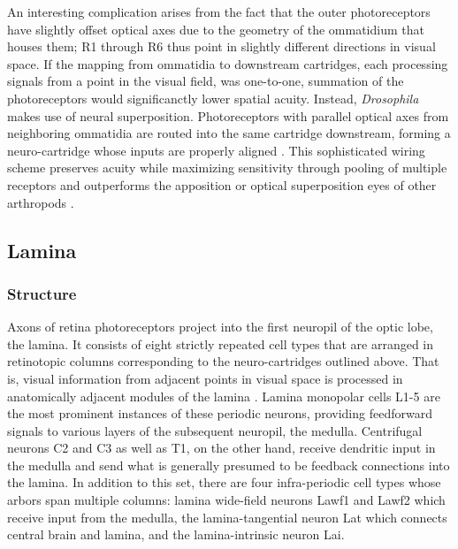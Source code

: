 An interesting complication arises from the fact that the outer photoreceptors have slightly offset optical axes due to the geometry of the ommatidium that houses them; R1 through R6 thus point in slightly different directions in visual space. If the mapping from ommatidia to downstream cartridges, each processing signals from a point in the visual field, was one-to-one, summation of the photoreceptors would significanctly lower spatial acuity. Instead, \textit{Drosophila} makes use of neural superposition. Photoreceptors with parallel optical axes from neighboring ommatidia are routed into the same cartridge downstream, forming a neuro-cartridge whose inputs are properly aligned \citep{Trujillo:1966aa,Braitenberg:1967aa}. This sophisticated wiring scheme preserves acuity while maximizing sensitivity through pooling of multiple receptors and outperforms the apposition or optical superposition eyes of other arthropods \citep{Kirschfeld:1967aa}.

\subsection{Lamina}

\subsubsection{Structure}
Axons of retina photoreceptors project into the first neuropil of the optic lobe, the lamina. It consists of eight strictly repeated cell types that are arranged in retinotopic columns corresponding to the neuro-cartridges outlined above. That is, visual information from adjacent points in visual space is processed in anatomically adjacent modules of the lamina \citep{Fischbach:1989uw}. Lamina monopolar cells L1-5 are the most prominent instances of these periodic neurons, providing feedforward signals to various layers of the subsequent neuropil, the medulla. Centrifugal neurons C2 and C3 as well as T1, on the other hand, receive dendritic input in the medulla and send what is generally presumed to be feedback connections into the lamina. In addition to this set, there are four infra-periodic cell types whose arbors span multiple columns: lamina wide-field neurons Lawf1 and Lawf2 which receive input from the medulla, the lamina-tangential neuron Lat which connects central brain and lamina, and the lamina-intrinsic neuron Lai.

